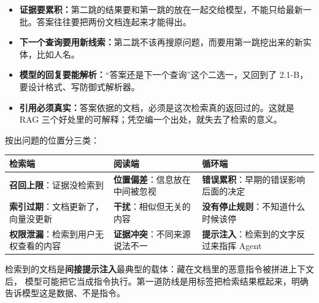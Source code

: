 \begin{itemize}
  \item \textbf{证据要累积：}第二跳的结果要和第一跳的放在一起交给模型，不能只给最新一批。答案往往要把两份文档连起来才能得出。
  \item \textbf{下一个查询要用新线索：}第二跳不该再搜原问题，而要用第一跳挖出来的新实体，比如人名。
  \item \textbf{模型的回复要能解析：}“答案还是下一个查询”这个二选一，又回到了 2.1-B，要设计格式、写防御式解析器。
  \item \textbf{引用必须真实：}答案依据的文档，必须是这次检索真的返回过的。这就是 RAG 三个好处里的可解释；凭空编一个出处，就失去了检索的意义。
\end{itemize}

按出问题的位置分三类：

\begin{center}
\begin{tabular}{p{4.9cm} p{4.9cm} p{4.9cm}}
  \toprule
  \textbf{检索端} & \textbf{阅读端} & \textbf{循环端} \\
  \midrule
  \textbf{召回上限}：证据没检索到 &
  \textbf{位置偏差}：信息放在中间被忽视 &
  \textbf{错误累积}：早期的错误影响后面的决定 \\
  \addlinespace
  \textbf{索引过期}：文档更新了，向量没更新 &
  \textbf{干扰}：相似但无关的内容 &
  \textbf{没有停止规则}：不知道什么时候该停 \\
  \addlinespace
  \textbf{权限泄漏}：检索到用户无权查看的内容 &
  \textbf{证据冲突}：不同来源说法不一 &
  \textbf{提示注入}：检索到的文字反过来指挥 Agent \\
  \bottomrule
\end{tabular}
\end{center}

\begin{note}
检索到的文档是\textbf{间接提示注入}最典型的载体：藏在文档里的恶意指令被拼进上下文后，
模型可能把它当成指令执行。第一道防线是用标签把检索结果框起来，明确告诉模型这是数据、不是指令。
\end{note}
